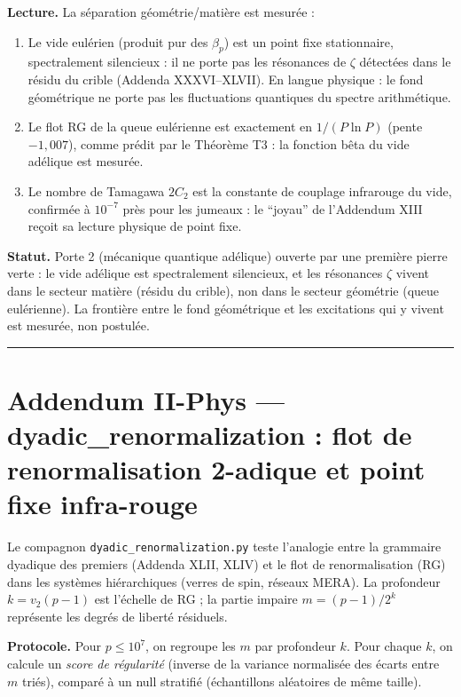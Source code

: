 \documentclass[11pt,a4paper]{article}
\begin{document}
\textbf{Lecture.} La séparation géométrie/matière est mesurée :
\begin{enumerate}
\item Le vide eulérien (produit pur des $\beta_p$) est un point fixe
stationnaire, spectralement silencieux : il ne porte pas les résonances de
$\zeta$ détectées dans le résidu du crible (Addenda XXXVI--XLVII). En langue
physique : le fond géométrique ne porte pas les fluctuations quantiques du
spectre arithmétique.
\item Le flot RG de la queue eulérienne est exactement en $1/(P \ln P)$
(pente $-1{,}007$), comme prédit par le Théorème T3 : la fonction bêta du
vide adélique est mesurée.
\item Le nombre de Tamagawa $2C_2$ est la constante de couplage infrarouge
du vide, confirmée à $10^{-7}$ près pour les jumeaux : le ``joyau'' de
l'Addendum XIII reçoit sa lecture physique de point fixe.
\end{enumerate}

\textbf{Statut.} Porte 2 (mécanique quantique adélique) ouverte par une
première pierre verte : le vide adélique est spectralement silencieux, et
les résonances $\zeta$ vivent dans le secteur matière (résidu du crible),
non dans le secteur géométrie (queue eulérienne). La frontière entre le
fond géométrique et les excitations qui y vivent est mesurée, non postulée.

\vspace{1cm}
\hrule
\vspace{1cm}

\section*{Addendum II-Phys --- dyadic\_renormalization : flot de renormalisation 2-adique et point fixe infra-rouge}

Le compagnon \texttt{dyadic\_renormalization.py} teste l'analogie entre la grammaire dyadique des premiers (Addenda XLII, XLIV) et le flot de renormalisation (RG) dans les systèmes hiérarchiques (verres de spin, réseaux MERA). La profondeur $k = v_2(p-1)$ est l'échelle de RG ; la partie impaire $m = (p-1)/2^k$ représente les degrés de liberté résiduels.

\textbf{Protocole.} Pour $p \le 10^7$, on regroupe les $m$ par profondeur $k$. Pour chaque $k$, on calcule un \textit{score de régularité} (inverse de la variance normalisée des écarts entre $m$ triés), comparé à un null stratifié (échantillons aléatoires de même taille).
\end{document}
